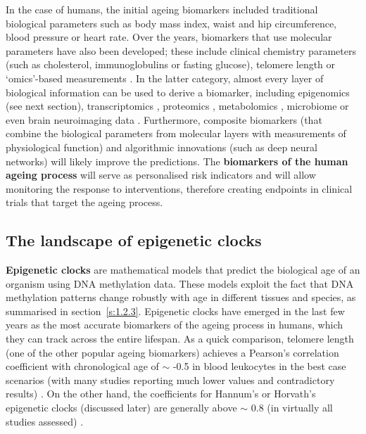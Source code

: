 In the case of humans, the initial ageing biomarkers included traditional biological parameters such as body mass index, waist and hip circumference, blood pressure or heart rate. Over the years, biomarkers that use molecular parameters have also been developed; these include clinical chemistry parameters (such as cholesterol, immunoglobulins or fasting glucose), telomere length or `omics'-based measurements \citep{Burkle2015a,Jylhava2017}. In the latter category, almost every layer of biological information can be used to derive a biomarker, including epigenomics (see next section), transcriptomics \citep{Peters2015a}, proteomics \citep{Tanaka2018}, metabolomics \citep{Hertel2016}, microbiome \citep{Galkin2018} or even brain neuroimaging data \citep{Cole2017a}. Furthermore, composite biomarkers (that combine the biological parameters from molecular layers with measurements of physiological function) \citep{Khan2017} and algorithmic innovations (such as deep neural networks) \citep{Putin2016} will likely improve the predictions. The \textbf{biomarkers of the human ageing process} will serve as personalised risk indicators and will allow monitoring the response to interventions, therefore creating endpoints in clinical trials that target the ageing process.

\smallskip

\subsection{The landscape of epigenetic clocks}

\smallskip

\textbf{Epigenetic clocks} are mathematical models that predict the biological age of an organism using DNA methylation data. These models exploit the fact that DNA methylation patterns change robustly with age in different tissues and species, as summarised in section~\ref{s:1.2.3}. Epigenetic clocks have emerged in the last few years as the most accurate biomarkers of the ageing process in humans, which they can track across the entire lifespan. As a quick comparison, telomere length (one of the other popular ageing biomarkers) achieves a Pearson's correlation coefficient with chronological age of $\sim$ -0.5 in blood leukocytes in the best case scenarios (with many studies reporting much lower values and contradictory results) \citep{Newman2013}. On the other hand, the coefficients for Hannum's or Horvath's epigenetic clocks (discussed later) are generally above $\sim$ 0.8 (in virtually all studies assessed) \citep{Chen2016}.

